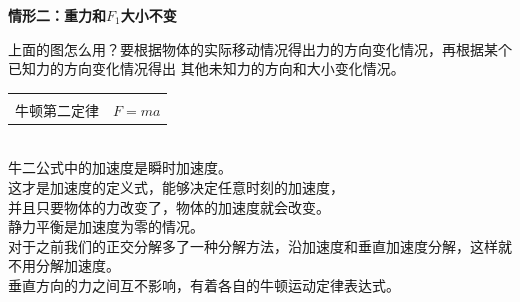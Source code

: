 \documentclass[a4paper, landscape, 10pt, twocolumn]{article}
\begin{document}
\hfill
\begin{minipage}{0.48\columnwidth}
  \centering
  \textbf{情形二：重力和$F_1$大小不变}\\
\end{minipage}
上面的图怎么用？要根据物体的实际移动情况得出力的方向变化情况，再根据某个已知力的方向变化情况得出
其他未知力的方向和大小变化情况。
\newpage
\noindent
\begin{tabularx}{\columnwidth}{XX}
  \rowcolor{blue!30}
  \multicolumn{2}{l}{\parbox[c][2.5\ht\strutbox][c]{0.9\columnwidth}{\Large 动力学}} \\
  牛顿第二定律&$F=ma$\\
\end{tabularx}
\\
牛二公式中的加速度是瞬时加速度。\\
这才是加速度的定义式，能够决定任意时刻的加速度，\\
并且只要物体的力改变了，物体的加速度就会改变。\\
静力平衡是加速度为零的情况。\\
对于之前我们的正交分解多了一种分解方法，沿加速度和垂直加速度分解，这样就不用分解加速度。\\
垂直方向的力之间互不影响，有着各自的牛顿运动定律表达式。\newline
\end{document}
